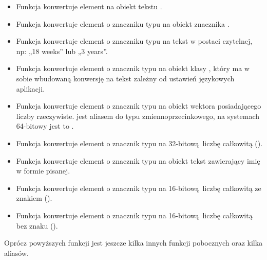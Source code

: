 \begin{itemize}
    \item {}

          Funkcja konwertuje element na obiekt tekstu .

    \item {}

          Funkcja konwertuje element o znaczniku typu  na obiekt znacznika .

    \item {}

          Funkcja konwertuje element o znaczniku typu  na tekst w postaci czytelnej, np: „18 weeks” lub „3 years”.

    \item {}

          Funkcja konwertuje element o znacznik typu  na obiekt klasy , który ma w sobie wbudowaną konwersję na tekst zależny od ustawień językowych aplikacji.

    \item {}

          Funkcja konwertuje element o znacznik typu  na obiekt wektora posiadającego liczby rzeczywiste.
           jest aliasem do typu zmiennoprzecinkowego, na systemach 64-bitowy jest to .

    \item {}

          Funkcja konwertuje element o znacznik typu  na 32-bitową liczbę całkowitą ().

    \item {}

          Funkcja konwertuje element o znacznik typu  na obiekt tekst zawierający imię w formie pisanej.

    \item {}

          Funkcja konwertuje element o znacznik typu  na 16-bitową liczbę całkowitą ze znakiem ().

    \item {}

          Funkcja konwertuje element o znacznik typu  na 16-bitową liczbę całkowitą bez znaku ().

\end{itemize}
Oprócz powyższych funkcji jest jeszcze kilka innych funkcji pobocznych oraz kilka aliasów.

